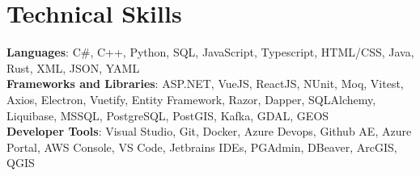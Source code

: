 \documentclass[letterpaper,11pt]{article}
\begin{document}
\section{Technical Skills}
\begin{itemize}[leftmargin=0.15in, label={}]
   \small{\item{
    \textbf{Languages}{: C\#, C++, Python, SQL, JavaScript, Typescript, HTML/CSS, Java, Rust, XML, JSON, YAML} \\
    \textbf{Frameworks and Libraries}{: ASP.NET, VueJS, ReactJS, NUnit, Moq, Vitest, Axios, Electron, Vuetify, Entity Framework, Razor, Dapper, SQLAlchemy, Liquibase, MSSQL, PostgreSQL, PostGIS, Kafka, GDAL, GEOS} \\
    \textbf{Developer Tools}{: Visual Studio, Git, Docker, Azure Devops, Github AE, Azure Portal, AWS Console, VS Code, Jetbrains IDEs, PGAdmin, DBeaver, ArcGIS, QGIS}
   }}
\end{itemize}


\end{document}
